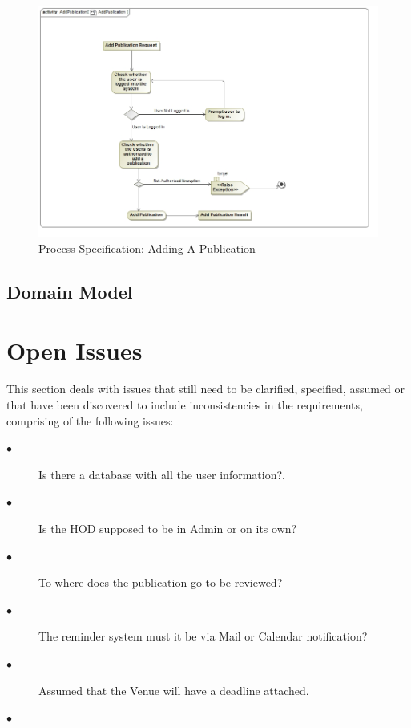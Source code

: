 \documentclass[a4paper]{article}
\begin{document}
	\begin{figure}[H]
	    \centering
	    \includegraphics[width=\textwidth]{AddPublication.jpg}
	    \caption{Process Specification: Adding A Publication}
	\end{figure}
	\subsection{Domain Model}
	
	
	\section{Open Issues}
	This section deals with issues that still need to be clarified, specified, assumed or that have been discovered to include inconsistencies in the requirements, comprising of the following issues:
	\begin{description}
		\item[$\bullet$] Is there a database with all the user information?.
	\end{description}
	\begin{description}
		\item[$\bullet$] Is the HOD supposed to be in Admin or on its own?
	\end{description}
	\begin{description}
	\item[$\bullet$] To where does the publication go to be reviewed?
	\end{description}
	\begin{description}
	\item[$\bullet$] The reminder system must it be via Mail or Calendar notification?
	\end{description}
	\begin{description}
	\item[$\bullet$] Assumed that the Venue will have a deadline attached.
	\end{description}
	\begin{description}
	\item[$\bullet$] 
	\end{description}	
\end{document}
